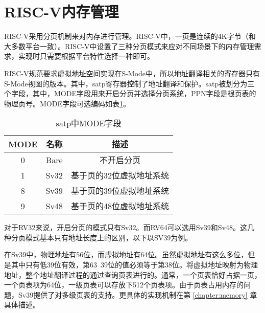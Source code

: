 \section{RISC-V内存管理}

RISC-V采用分页机制来对内存进行管理。RISC-V中，一页是连续的4K字节（和大多数平台一致）。RISC-V中设置了三种分页模式来应对不同场景下的内存管理需求，实现时只需要根据平台特性选择一种即可。

RISC-V规范要求虚拟地址空间实现在S-Mode中，所以地址翻译相关的寄存器只有S-Mode视图的版本。其中，satp寄存器控制了地址翻译和保护。satp被划分为三个字段，其中，MODE字段用来开启分页并选择分页系统，PPN字段是根页表的物理页号。MODE字段可选编码如表\ref{tab:satpmode}。

\begin{table}[h]
	\centering
	\setlength{\belowcaptionskip}{2pt}
	\caption{satp中MODE字段}
	\label{tab:satpmode}
	\begin{tabular}{|c|c|c|}
		\hline
		MODE             & 名称       & 描述                                        \\ \hline
		0                & Bare       & 不开启分页                                   \\ \hline
		1                & Sv32       & 基于页的32位虚拟地址系统                      \\ \hline
		8                & Sv39       &          基于页的39位虚拟地址系统                      \\ \hline
		9                & Sv48       & 基于页的48位虚拟地址系统                      \\ \hline
	\end{tabular}
\end{table}

对于RV32来说，开启分页的模式只有Sv32。而RV64可以选用Sv39和Sv48。这几种分页模式基本只有地址长度上的区别，以下以SV39为例。

在Sv39中，物理地址有56位，而虚拟地址有64位。虽然虚拟地址有这么多位，但是其中只有低39位有效，第63~39位的值必须等于第38位。将虚拟地址映射为物理地址，整个地址翻译过程的通过查询页表进行的。通常，一个页表恰好占据一页，一个页表项为64位，一级页表可以存放下512个页表项。由于页表占用内存的问题，Sv39提供了对多级页表的支持。更具体的实现机制在第 \ref{chapter:memory} 章具体描述。